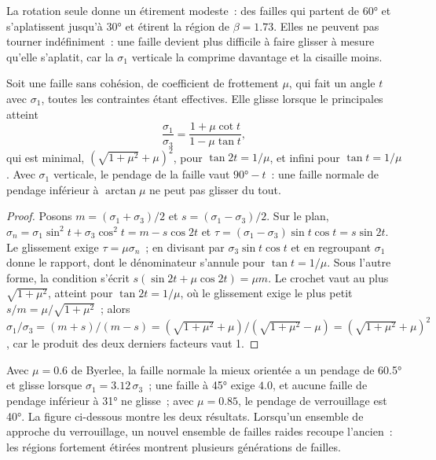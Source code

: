 La rotation seule donne un étirement modeste~: des failles qui partent de \ang{60} et
s'aplatissent jusqu'à \ang{30} et étirent la région de $\beta = 1.73$. Elles ne peuvent
pas tourner indéfiniment~: une faille devient plus difficile à faire glisser à mesure qu'elle s'aplatit, car la
$\sigma_1$ verticale la comprime davantage et la cisaille moins.

\begin{proposition}\label{prop:b3:extension-strike-slip:lockup}
Soit une faille sans cohésion, de coefficient de frottement $\mu$, qui fait un angle
$t$ avec $\sigma_1$, toutes les contraintes étant effectives. Elle glisse lorsque le  principales atteint
\[
  \frac{\sigma_1}{\sigma_3} = \frac{1 + \mu\cot t}{1 - \mu\tan t} ,
\]
qui est minimal, $(\sqrt{1 + \mu^2} + \mu)^2$, pour $\tan2t = 1/\mu$, et
infini pour $\tan t = 1/\mu$. Avec $\sigma_1$ verticale, le pendage de la faille vaut
$\ang{90} - t$~: une faille normale de pendage inférieur à $\arctan\mu$ ne peut pas glisser
du tout.
\end{proposition}

\begin{proof}
Posons $m = (\sigma_1 + \sigma_3)/2$ et $s = (\sigma_1 - \sigma_3)/2$. Sur
le plan, $\sigma_n = \sigma_1\sin^2t + \sigma_3\cos^2t = m - s\cos2t$ et
$\tau = (\sigma_1 - \sigma_3)\sin t\cos t = s\sin2t$. Le glissement exige $\tau =
\mu\sigma_n$~; en divisant par $\sigma_3\sin t\cos t$ et en regroupant $\sigma_1$
donne le rapport, dont le dénominateur s'annule pour $\tan t = 1/\mu$. Sous l'autre
forme, la condition s'écrit $s(\sin2t + \mu\cos2t) = \mu m$. Le crochet vaut au
plus $\sqrt{1 + \mu^2}$, atteint pour $\tan2t = 1/\mu$, où le glissement exige le
plus petit $s/m = \mu/\sqrt{1 + \mu^2}$~; alors $\sigma_1/\sigma_3 = (m + s)/(m - s) =
(\sqrt{1 + \mu^2} + \mu)/(\sqrt{1 + \mu^2} - \mu) = (\sqrt{1 + \mu^2} +
\mu)^2$, car le produit des deux derniers facteurs vaut 1.
\end{proof}

Avec $\mu = 0.6$ de Byerlee, la faille normale la mieux orientée a un pendage de \ang{60.5} et
glisse lorsque $\sigma_1 = 3.12\,\sigma_3$~; une faille à \ang{45} exige $4.0$, et
aucune faille de pendage inférieur à \ang{31} ne glisse~; avec $\mu = 0.85$, le pendage de verrouillage est
\ang{40}. La figure ci-dessous montre les deux résultats. Lorsqu'un ensemble de  approche
du verrouillage, un nouvel ensemble de failles raides recoupe l'ancien~: les régions fortement étirées
montrent plusieurs générations de failles.

